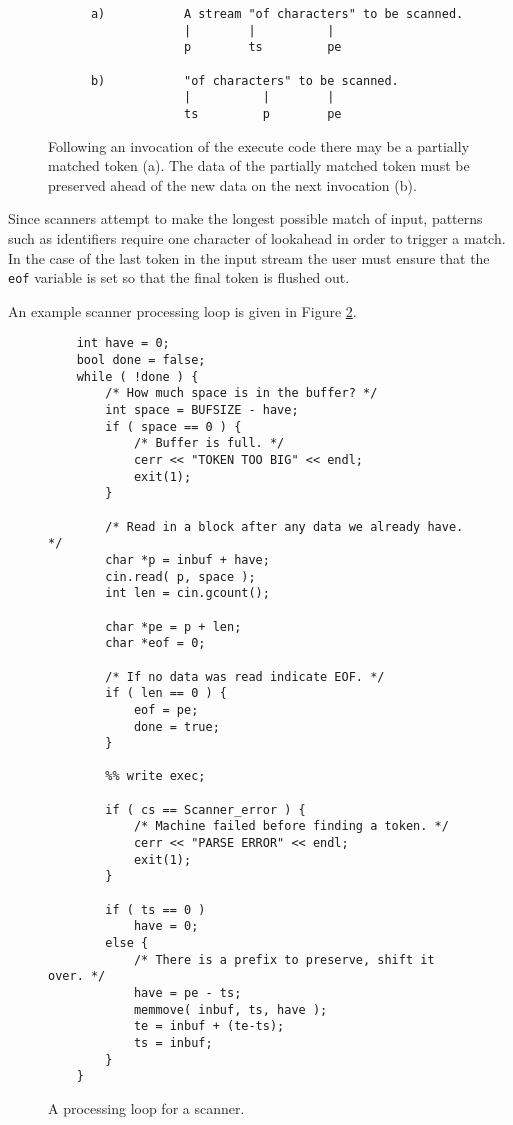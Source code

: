 \documentclass[letterpaper,11pt,oneside]{book}
\newcommand{\verbspace}{\vspace{10pt}}
\begin{document}
\begin{figure}
\small
\begin{verbatim}
      a)           A stream "of characters" to be scanned.
                   |        |          |
                   p        ts         pe

      b)           "of characters" to be scanned.
                   |          |        |
                   ts         p        pe
\end{verbatim}
\verbspace
\caption{Following an invocation of the execute code there may be a partially
matched token (a). The data of the partially matched token 
must be preserved ahead of the new data on the next invocation (b).
}
\label{preserve_example}
\end{figure}

Since scanners attempt to make the longest possible match of input, patterns
such as identifiers require one character of lookahead in order to trigger a
match. In the case of the last token in the input stream the user must ensure
that the \verb|eof| variable is set so that the final token is flushed out.

An example scanner processing loop is given in Figure \ref{scanner-loop}.

\begin{figure}
\small
\begin{verbatim}
    int have = 0;
    bool done = false;
    while ( !done ) {
        /* How much space is in the buffer? */
        int space = BUFSIZE - have;
        if ( space == 0 ) {
            /* Buffer is full. */
            cerr << "TOKEN TOO BIG" << endl;
            exit(1);
        }

        /* Read in a block after any data we already have. */
        char *p = inbuf + have;
        cin.read( p, space );
        int len = cin.gcount();

        char *pe = p + len;
        char *eof = 0;

        /* If no data was read indicate EOF. */
        if ( len == 0 ) {
            eof = pe;
            done = true;
        }

        %% write exec;

        if ( cs == Scanner_error ) {
            /* Machine failed before finding a token. */
            cerr << "PARSE ERROR" << endl;
            exit(1);
        }

        if ( ts == 0 )
            have = 0;
        else {
            /* There is a prefix to preserve, shift it over. */
            have = pe - ts;
            memmove( inbuf, ts, have );
            te = inbuf + (te-ts);
            ts = inbuf;
        }
    }
\end{verbatim}
\verbspace
\caption{A processing loop for a scanner.
}
\label{scanner-loop}
\end{figure}
\end{document}
